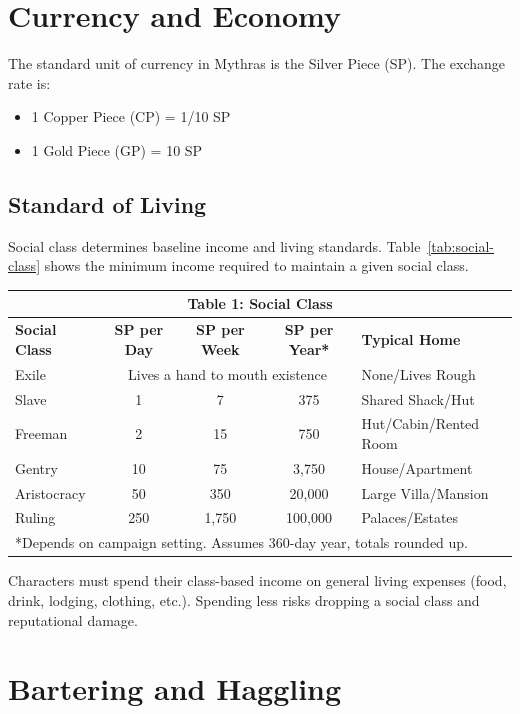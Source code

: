 \documentclass[10pt]{article}
\newcommand{\tableref}[1]{Table~\ref{#1}}
\begin{document}
\section{Currency and Economy}
\label{sec:currency}

The standard unit of currency in Mythras is the Silver Piece (SP). The exchange rate is:
\begin{itemize}
    \item 1 Copper Piece (CP) = 1/10 SP
    \item 1 Gold Piece (GP) = 10 SP
\end{itemize}

\subsection{Standard of Living}
\label{sec:living-standards}

Social class determines baseline income and living standards. \tableref{tab:social-class} shows the minimum income required to maintain a given social class.

\begin{longtable}[c]{|l|c|c|c|l|}
\hline
\multicolumn{5}{|c|}{\textbf{Table 1: Social Class}} \\
\hline
\textbf{Social Class} & \textbf{SP per Day} & \textbf{SP per Week} & \textbf{SP per Year*} & \textbf{Typical Home} \\
\hline
Exile & \multicolumn{3}{c|}{Lives a hand to mouth existence} & None/Lives Rough \\
\hline
Slave & 1 & 7 & 375 & Shared Shack/Hut \\
\hline
Freeman & 2 & 15 & 750 & Hut/Cabin/Rented Room \\
\hline
Gentry & 10 & 75 & 3,750 & House/Apartment \\
\hline
Aristocracy & 50 & 350 & 20,000 & Large Villa/Mansion \\
\hline
Ruling & 250 & 1,750 & 100,000 & Palaces/Estates \\
\hline
\multicolumn{5}{l}{*Depends on campaign setting. Assumes 360-day year, totals rounded up.} \\
\hline
\end{longtable}
Characters must spend their class-based income on general living expenses (food, drink, lodging, clothing, etc.). Spending less risks dropping a social class and reputational damage.



\section{Bartering and Haggling}
\label{sec:trade}
\end{document}
